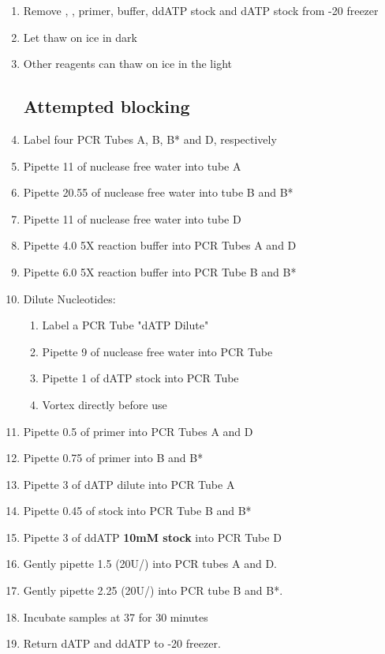 \documentclass{ssiBio}
\begin{document}
\begin{enumerate}
\item{Remove \BdATP{}, \tdt{}, primer, \tdt{}  buffer, ddATP stock and dATP stock from -20\C{} freezer}
\item{Let \BdATP{} thaw on ice in dark}
\item{Other reagents can thaw on ice in the light}
\subsection{Attempted blocking}
\item{Label four PCR Tubes A, B, B* and D, respectively}
\item{Pipette 11\uL{} of nuclease free water into tube A}
\item{Pipette 20.55\uL{} of nuclease free water into tube B and B*}
\item{Pipette 11\uL{} of nuclease free water into tube D}
\item{Pipette 4.0\uL{} 5X \tdt{} reaction buffer into PCR Tubes A and D}
\item{Pipette 6.0\uL{} 5X \tdt{} reaction buffer into PCR Tube B and B*}
\item{Dilute Nucleotides:
\begin{enumerate}
\item{Label a PCR Tube "dATP Dilute"}
\item{Pipette 9\uL{} of nuclease free water into PCR Tube}
\item{Pipette 1\uL{} of dATP stock into PCR Tube}
\item{Vortex directly before use}
\end{enumerate}
}
\item{Pipette 0.5\uL{} of primer into PCR Tubes A and D}
\item{Pipette 0.75\uL{} of primer into B and B*}
\item{Pipette 3\uL{} of dATP dilute into PCR Tube A}
\item{Pipette 0.45\uL{} of \BdATP{} stock into PCR Tube B and B*}\\ %
\item{Pipette 3\uL{} of ddATP \textbf{10mM stock} into PCR Tube D}
\item{Gently pipette 1.5\uL{} \tdt (20U/\uL{}) into PCR tubes A and D.}
\item{Gently pipette 2.25\uL{} \tdt (20U/\uL{}) into PCR tube B and B*.}
\item{Incubate samples at 37\C{} for 30 minutes}
\item{Return dATP and ddATP to -20\C{} freezer.}
\stopPoint{} 

\end{enumerate}
\end{document}
